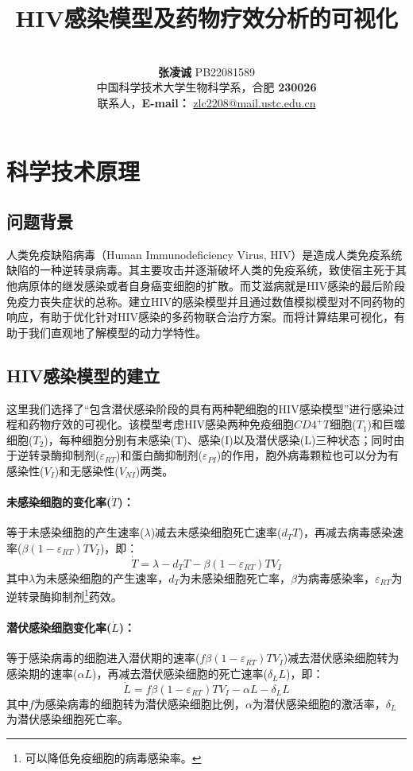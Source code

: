 \documentclass{ctexart}
\title{HIV感染模型及药物疗效分析的可视化}
\date{}
\author{\qquad \\ \textbf{\Large{张凌诚} }PB22081589 \\中国科学技术大学生物科学系，合肥 \textbf{230026} \\联系人，\textbf{E-mail：} \href{zlc2208@mail.ustc.edu.cn}{zlc2208@mail.ustc.edu.cn}}
\begin{document}
\maketitle
\begin{titlepage}
    \tableofcontents
\end{titlepage}

\section{科学技术原理}
\subsection{问题背景}
人类免疫缺陷病毒（Human Immunodeficiency Virus, HIV）是造成人类免疫系统缺陷的一种逆转录病毒。其主要攻击并逐渐破坏人类的免疫系统，致使宿主死于其他病原体的继发感染或者自身癌变细胞的扩散。而艾滋病就是HIV感染的最后阶段免疫力丧失症状的总称。建立HIV的感染模型并且通过数值模拟模型对不同药物的响应，有助于优化针对HIV感染的多药物联合治疗方案。而将计算结果可视化，有助于我们直观地了解模型的动力学特性。

\subsection{HIV感染模型的建立}
这里我们选择了“包含潜伏感染阶段的具有两种靶细胞的HIV感染模型”\cite{1}进行感染过程和药物疗效的可视化。该模型考虑HIV感染两种免疫细胞$CD4^{+}T$细胞($T_{1}$)和巨噬细胞($T_{2}$)，每种细胞分别有未感染(T)、感染(I)以及潜伏感染(L)三种状态\cite{3}；同时由于逆转录酶抑制剂($\varepsilon _{RT}$)和蛋白酶抑制剂($\varepsilon _{PI}$)的作用\cite{2}，胞外病毒颗粒也可以分为有感染性($V_{I}$)和无感染性($V_{NI}$)两类。

\paragraph{未感染细胞的变化率($\dot{T} $)：}等于未感染细胞的产生速率($\lambda $)减去未感染细胞死亡速率($d_{T}T$)，再减去病毒感染速率($\beta (1-\varepsilon _{RT})TV_{I}$)，即：
$$\dot{T}=\lambda-d_{T}T-\beta (1-\varepsilon _{RT})TV_{I}$$
其中$\lambda$为未感染细胞的产生速率，$d_{T}$为未感染细胞死亡率，$\beta $为病毒感染率，$\varepsilon _{RT}$为逆转录酶抑制剂\footnote{可以降低免疫细胞的病毒感染率。}药效。

\paragraph{潜伏感染细胞变化率($\dot{L}$)：}等于感染病毒的细胞进入潜伏期的速率($f\beta (1-\varepsilon _{RT})TV_{I}$)减去潜伏感染细胞转为感染期的速率($\alpha L$)，再减去潜伏感染细胞的死亡速率($\delta _{L}L$)，即：
$$\dot{L}=f\beta (1-\varepsilon _{RT})TV_{I}-\alpha L-\delta _{L}L$$
其中$f$为感染病毒的细胞转为潜伏感染细胞比例，$\alpha$为潜伏感染细胞的激活率，$\delta _{L}$为潜伏感染细胞死亡率。
\end{document}
